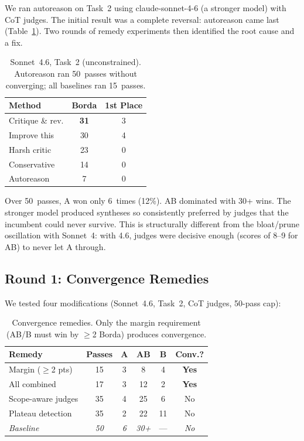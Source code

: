 \documentclass[10pt,twocolumn]{article}
\begin{document}
We ran autoreason on Task~2 using claude-sonnet-4-6 (a stronger model) with CoT judges. The initial result was a complete reversal: autoreason came last (Table~\ref{tab:scaling}). Two rounds of remedy experiments then identified the root cause and a fix.

\begin{table}[H]
\centering
\small
\begin{tabular}{@{}lcc@{}}
\toprule
\textbf{Method} & \textbf{Borda} & \textbf{1st Place} \\
\midrule
Critique \& rev. & \textbf{31} & 3 \\
\rowcolor{TableShade}
Improve this & 30 & 4 \\
Harsh critic & 23 & 0 \\
\rowcolor{TableShade}
Conservative & 14 & 0 \\
Autoreason & 7 & 0 \\
\bottomrule
\end{tabular}
\caption{Sonnet~4.6, Task~2 (unconstrained). Autoreason ran 50~passes without converging; all baselines ran 15~passes.}
\label{tab:scaling}
\end{table}

Over 50~passes, A won only 6~times (12\%). AB dominated with 30+ wins. The stronger model produced syntheses so consistently preferred by judges that the incumbent could never survive. This is structurally different from the bloat/prune oscillation with Sonnet~4: with 4.6, judges were decisive enough (scores of 8--9 for AB) to never let A through.

\subsection{Round 1: Convergence Remedies}

We tested four modifications (Sonnet~4.6, Task~2, CoT judges, 50-pass cap):

\begin{table}[H]
\centering
\small
\begin{tabular}{@{}lccccc@{}}
\toprule
\textbf{Remedy} & \textbf{Passes} & \textbf{A} & \textbf{AB} & \textbf{B} & \textbf{Conv.?} \\
\midrule
\rowcolor{TableShade}
Margin ($\geq$2 pts) & 15 & 3 & 8 & 4 & \textbf{Yes} \\
All combined & 17 & 3 & 12 & 2 & \textbf{Yes} \\
\rowcolor{TableShade}
Scope-aware judges & 35 & 4 & 25 & 6 & No \\
Plateau detection & 35 & 2 & 22 & 11 & No \\
\rowcolor{TableShade}
\textit{Baseline} & \textit{50} & \textit{6} & \textit{30+} & --- & \textit{No} \\
\bottomrule
\end{tabular}
\caption{Convergence remedies. Only the margin requirement (AB/B must win by $\geq$2 Borda) produces convergence.}
\label{tab:remedies}
\end{table}
\end{document}
